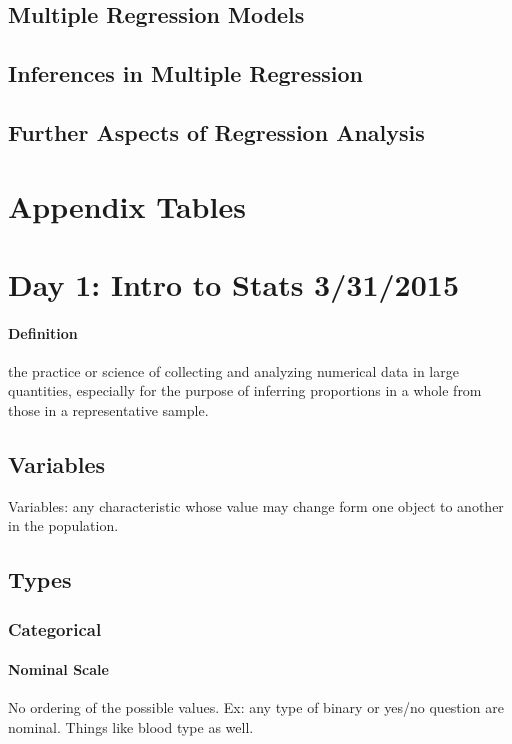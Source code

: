 \documentclass{article}
\newcommand{\p}[1]{\paragraph{#1}} %
\begin{document}
	\subsection{Multiple Regression Models} %
	
	\subsection{Inferences in Multiple Regression} %
	
	\subsection{Further Aspects of Regression Analysis} %
	
\clearpage
\section{Appendix Tables} %









\iffalse
\section{Day 1: Intro to Stats 3/31/2015}
	
	\p{Definition}
	the practice or science of collecting and analyzing numerical data in large quantities, especially
	for the purpose of inferring proportions in a whole from those in a representative sample.
	
	\subsection{Variables}
	Variables: any characteristic whose value may change form one object to another in the population.
	\subsection{Types}
		\subsubsection{Categorical}
			\p{Nominal Scale}
			 No ordering of the possible values. Ex: any type of binary or yes/no question are
			 nominal. Things like blood type as well.
			 
\end{document}
